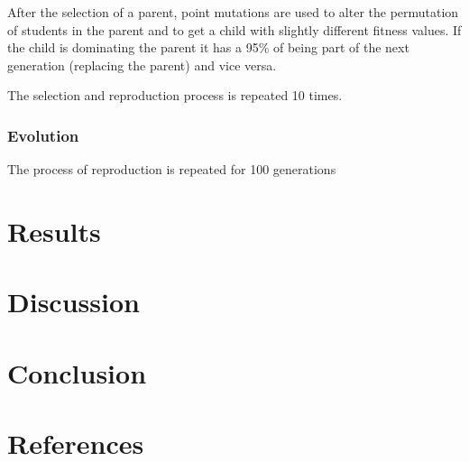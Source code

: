 \begin{onehalfspace}
After the selection of a parent, point mutations are used to alter the permutation of students in the parent and to get a child with slightly different fitness values. If the child is dominating the parent it has a 95\% of being part of the next generation (replacing the parent) and vice versa.

The selection and reproduction process is repeated 10 times. 

\subsubsection{Evolution}
The process of reproduction is repeated for 100 generations 










\section{Results}













\section{Discussion}


\section{Conclusion}

  
\end{onehalfspace}


\newpage
\section*{References}
\label{sec:refs}

\renewcommand{\bibsection}{\subsection*{Literature}}
\label{sec:Literature}

\newpage

\renewcommand{\bibsection}{\subsection{Other Sources}}

